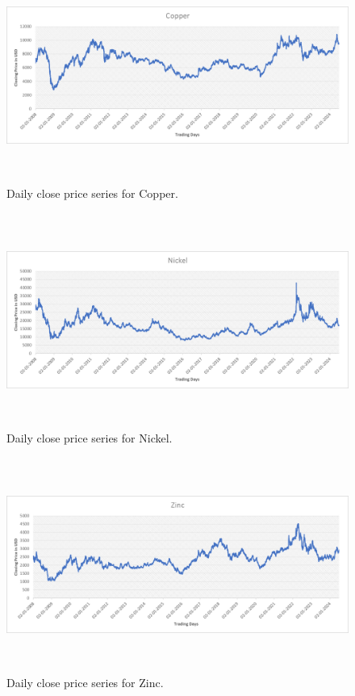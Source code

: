 \documentclass[preprint,12pt]{elsarticle}
\begin{document}
\begin{center}
	\begin{figure}[!htbp]
		\centering
		\includegraphics[width=13cm, height=7cm]{Co.png}
		\caption{Daily close price series for Copper.}
		\label{fig:Co}
	\end{figure}
\end{center}

\begin{center}
	\begin{figure}[!htbp]
		\centering
		\includegraphics[width=13cm, height=7cm]{N.png}
		\caption{Daily close price series for Nickel.}
		\label{fig:N}
	\end{figure}
\end{center}

\begin{center}
	\begin{figure}[!htbp]
		\centering
		\includegraphics[width=13cm, height=7cm]{Z.png}
		\caption{Daily close price series for Zinc.}
		\label{fig:Z}
	\end{figure}
\end{center}
\end{document}
